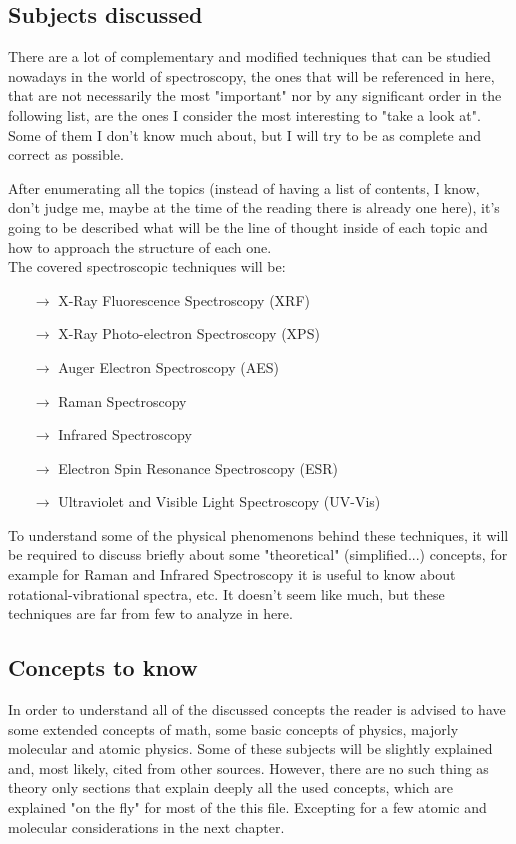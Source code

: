 \documentclass[]{article}
\begin{document}
\subsection{Subjects discussed}
\par There are a lot of complementary and modified techniques that can be studied nowadays in the world of spectroscopy, the ones that will be referenced in here, that are not necessarily the most "important" nor by any significant order in the following list, are the ones I consider the most interesting to "take a look at". Some of them I don't know much about, but I will try to be as complete and correct as possible.
\par After enumerating all the topics (instead of having a list of contents, I know, don't judge me, maybe at the time of the reading there is already one here), it's going to be described what will be the line of thought inside of each topic and how to approach the structure of each one.\\

The covered spectroscopic techniques will be:

\begin{itemize}
\item[$\to$] X-Ray Fluorescence Spectroscopy (XRF)
\item[$\to$] X-Ray Photo-electron Spectroscopy (XPS)
\item[$\to$] Auger Electron Spectroscopy (AES)
\item[$\to$] Raman Spectroscopy
\item[$\to$] Infrared Spectroscopy
\item[$\to$] Electron Spin Resonance Spectroscopy (ESR)
\item[$\to$] Ultraviolet and Visible Light Spectroscopy (UV-Vis)
\end{itemize}

\par To understand some of the physical phenomenons behind these techniques, it will be required to discuss briefly about some "theoretical" (simplified...) concepts, for example for Raman and Infrared Spectroscopy it is useful to know about rotational-vibrational spectra, etc. It doesn't seem like much, but these techniques are far from few to analyze in here.

\subsection{Concepts to know}
\par In order to understand all of the discussed concepts the reader is advised to have some extended concepts of math, some basic concepts of physics, majorly molecular and atomic physics. Some of these subjects will be slightly explained and, most likely, cited from other sources. However, there are no such thing as theory only sections that explain deeply all the used concepts, which are explained "on the fly" for most of the this file. Excepting for a few atomic and molecular considerations in the next chapter. 
\end{document}
